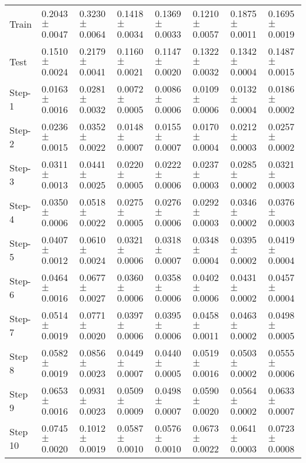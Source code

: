 \documentclass{ieeeaccess}
\begin{document}
\begin{table*}[htbp]
\begin{tabular}{llllllll}
Train &      
0.2043$\pm$	0.0047&
0.3230$\pm$	0.0064&
0.1418$\pm$	0.0034&
0.1369$\pm$	0.0033&
0.1210$\pm$	0.0057&
0.1875$\pm$	0.0011&0.1695$\pm$	0.0019\\
Test &      
0.1510$\pm$	0.0024&
0.2179$\pm$	0.0041&
0.1160$\pm$	0.0021&
0.1147$\pm$	0.0020&
0.1322$\pm$	0.0032&
0.1342$\pm$	0.0004&0.1487$\pm$	0.0015\\
Step-1 &      
0.0163$\pm$	0.0016&
0.0281$\pm$	0.0032&
0.0072$\pm$	0.0005&
0.0086$\pm$	0.0006&
0.0109$\pm$	0.0006&
0.0132$\pm$	0.0004&0.0186$\pm$	0.0002\\
Step-2 &      
0.0236$\pm$	0.0015&
0.0352$\pm$	0.0022&
0.0148$\pm$	0.0007&
0.0155$\pm$	0.0007&
0.0170$\pm$	0.0004&
0.0212$\pm$	0.0003&0.0257$\pm$	0.0002\\
Step-3 &      
0.0311$\pm$	0.0013&
0.0441$\pm$	0.0025&
0.0220$\pm$	0.0005&
0.0222$\pm$	0.0006&
0.0237$\pm$	0.0003&
0.0285$\pm$	0.0002&0.0321$\pm$	0.0003\\
Step-4 &      
0.0350$\pm$	0.0006&
0.0518$\pm$	0.0022&
0.0275$\pm$	0.0005&
0.0276$\pm$	0.0006&
0.0292$\pm$	0.0003&
0.0346$\pm$	0.0002&0.0376$\pm$	0.0003\\
Step-5 &      
0.0407$\pm$	0.0012&
0.0610$\pm$	0.0024&
0.0321$\pm$	0.0006&
0.0318$\pm$	0.0007&
0.0348$\pm$	0.0004&
0.0395$\pm$	0.0002&	0.0419	$\pm$0.0004\\
Step-6 &      
0.0464$\pm$	0.0016&
0.0677$\pm$	0.0027&
0.0360$\pm$	0.0006&
0.0358$\pm$	0.0006&
0.0402$\pm$	0.0006&
0.0431$\pm$	0.0002&0.0457$\pm$	0.0004\\
Step-7 &      
0.0514$\pm$	0.0019&
0.0771$\pm$	0.0020&
0.0397$\pm$	0.0006&
0.0395$\pm$	0.0006&
0.0458$\pm$	0.0011&
0.0463$\pm$	0.0002&	0.0498$\pm$	0.0005\\
Step 8 &      
0.0582$\pm$	0.0019&
0.0856$\pm$	0.0023&
0.0449$\pm$	0.0007&
0.0440$\pm$	0.0005&
0.0519$\pm$	0.0016&
0.0503$\pm$	0.0002&0.0555$\pm$	0.0006\\
Step 9 &      
0.0653$\pm$	0.0016&
0.0931$\pm$	0.0023&
0.0509$\pm$	0.0009&
0.0498$\pm$	0.0007&
0.0590$\pm$	0.0020&
0.0564$\pm$	0.0002&	0.0633$\pm$	0.0007\\
Step 10 &      
0.0745$\pm$	0.0020&
0.1012$\pm$	0.0019&
0.0587$\pm$	0.0010&
0.0576$\pm$	0.0010&
0.0673$\pm$	0.0022&
0.0641$\pm$	0.0003&	0.0723$\pm$	0.0008\\
\hline
 
\end{tabular}

\end{table*}
\end{document}
